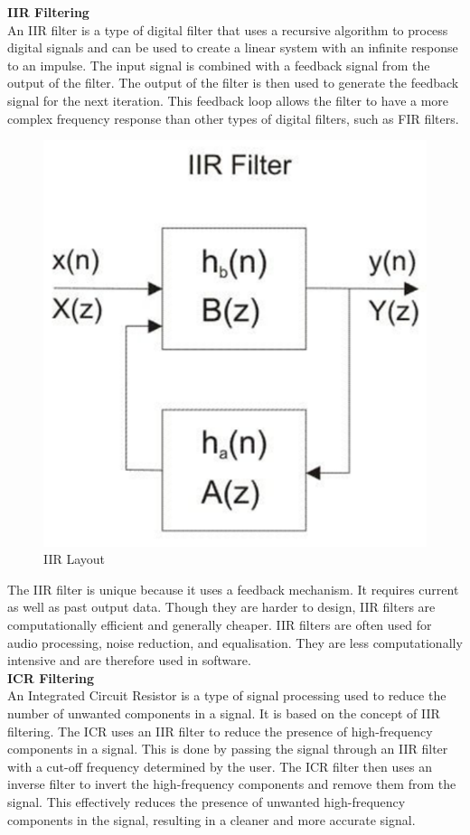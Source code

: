 \documentclass[12pt,a4paper]{article}
\begin{document}
			\textbf{IIR Filtering}\\
			An IIR filter is a type of digital filter that uses a recursive algorithm to process digital signals and can be used to create a linear system with an infinite response to an impulse. The input signal is combined with a feedback signal from the output of the filter. The output of the filter is then used to generate the feedback signal for the next iteration. This feedback loop allows the filter to have a more complex frequency response than other types of digital filters, such as FIR filters.\\
			\begin{figure}[H]
				\begin{center}
					\includegraphics[width=0.5\linewidth]{IIR}
				\end{center}
				\caption{IIR Layout}
			\end{figure}
			The IIR filter is unique because it uses a feedback mechanism. It requires current as well as past output data. Though they are harder to design, IIR filters are computationally efficient and generally cheaper\cite{IIR}.			
			IIR filters are often used for audio processing, noise reduction, and equalisation. They are less computationally intensive and are therefore used in software.\\
			\textbf{ICR Filtering}\\
			An Integrated Circuit Resistor is a type of signal processing used to reduce the number of unwanted components in a signal. It is based on the concept of IIR filtering. The ICR uses an IIR filter to reduce the presence of high-frequency components in a signal. This is done by passing the signal through an IIR filter with a cut-off frequency determined by the user. The ICR filter then uses an inverse filter to invert the high-frequency components and remove them from the signal. This effectively reduces the presence of unwanted high-frequency components in the signal, resulting in a cleaner and more accurate signal.
\end{document}
